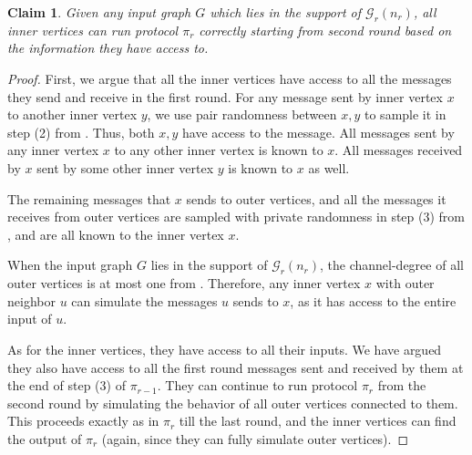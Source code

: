 \documentclass[11pt]{article}
\newtheorem{claim}[lemma]{Claim}
\theoremstyle{definition}
\newcommand{\prot}{\ensuremath{\pi}}
\newcommand{\cG}{\ensuremath{\mathcal{G}}}
\begin{document}
\begin{claim}\label{clm:run-round2}
	Given any input graph $G$ which lies in the support of $\cG_r(n_r)$, all inner vertices can run protocol $\prot_r$ correctly starting from second round based on the information they have access to. 
\end{claim}
\begin{proof}
	First, we argue that all the inner vertices have access to all the messages they send and receive in the first round. For any message sent by inner vertex $x$ to another inner vertex $y$, we use pair randomness between $x, y$ to sample it in step (2) from . Thus, both $x, y$ have access to the message. All messages sent by any inner vertex $x$ to any other inner vertex is known to $x$. All messages received by $x$ sent by some other inner vertex $y$ is known to $x$ as well. 
	
	The remaining messages that $x$ sends to outer vertices, and all the messages it receives from outer vertices are sampled with private randomness in step (3) from , and are all known to the inner vertex $x$. 
	
	When the input graph $G$ lies in the support of $\cG_r(n_r)$, the channel-degree of all outer vertices is at most one from . Therefore, any inner vertex $x$ with outer neighbor $u$ can simulate the messages $u$ sends to $x$, as it has access to the entire input of $u$. 
	
	As for the inner vertices, they have access to all their inputs. We have argued they also have access to all the first round messages sent and received by them at the end of step (3) of $\prot_{r-1}$. They can continue to run protocol $\prot_r$ from the second round by simulating the behavior of all outer vertices connected to them. This proceeds exactly as in $\prot_r$ till the last round, and the inner vertices can find the output of $\prot_r$ (again, since they can fully simulate outer vertices). 
\end{proof}
\end{document}
